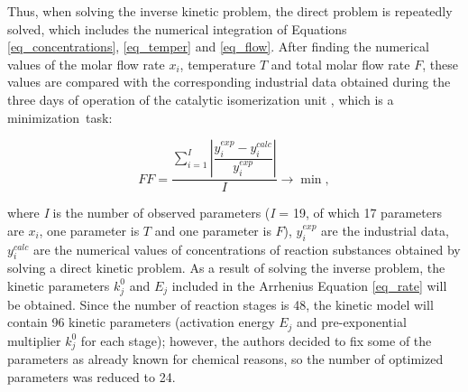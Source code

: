 \documentclass[mathematics,article,accept,pdftex,moreauthors]{Definitions/mdpi}
\begin{document}
\begin{table}[H]
	\end{table}
	
	
	
	Thus, when solving the inverse kinetic problem, the direct problem is repeatedly solved, which includes the numerical integration of Equations \eqref{eq_concentrations}, \eqref{eq_temper} and \eqref{eq_flow}. After finding the numerical values of the molar flow rate $x_i$, temperature $T$ and total molar flow rate $F$, these values are compared with the corresponding industrial data obtained during the three days of operation of the catalytic isomerization unit \cite{enik2021}, which is a minimization~task:
	
	\begin{linenomath}
		\begin{equation}\label{FF}
			FF = \dfrac{\sum_{i=1}^I \left| \dfrac{y_i^{exp} - y_i^{calc}}{y_i^{exp}} \right|}{I}\rightarrow\min,
		\end{equation}
	\end{linenomath}
	where \emph{I} is the number of observed parameters (\emph{I} = 19, of which 17 parameters are $x_i$, one parameter is $T$ and one parameter is $F$),  $y_{i}^{exp}$ are the industrial data, $y_{i}^{calc}$ are the numerical values of concentrations of reaction substances obtained by solving a direct kinetic problem. As a result of solving the inverse problem, the kinetic parameters $k^0_j$ and $E_j$ included in the Arrhenius Equation \eqref{eq_rate} will be obtained. Since the number of reaction stages is 48, the kinetic model will contain 96 kinetic parameters (activation energy $E_j$ and pre-exponential multiplier $k^0_j$ for each stage); however, the authors decided to fix some of the parameters as already known for chemical reasons, so the number of optimized parameters was reduced to 24.
	
\end{document}
